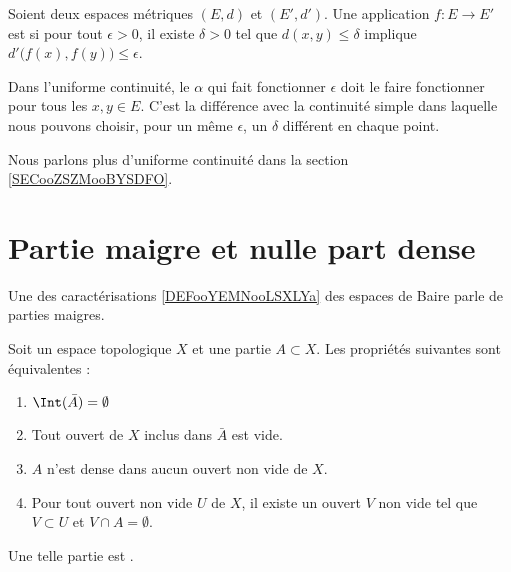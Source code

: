 \begin{definition}\label{DEFooYIPXooQTscbG}
	Soient deux espaces métriques \( (E,d)\) et \( (E',d')\). Une application \( f\colon E\to E'\) est  si pour tout \( \epsilon>0\), il existe \( \delta>0\) tel que \( d(x,y)\leq \delta\) implique \( d'\big( f(x),f(y) \big)\leq \epsilon\).
\end{definition}
Dans l'uniforme continuité, le \( \alpha\) qui fait fonctionner \( \epsilon\) doit le faire fonctionner pour tous les \( x,y\in E\). C'est la différence avec la continuité simple dans laquelle nous pouvons choisir, pour un même \( \epsilon\), un \( \delta\) différent en chaque point.

Nous parlons plus d'uniforme continuité dans la section \ref{SECooZSZMooBYSDFO}.

\section{Partie maigre et nulle part dense}


Une des caractérisations \ref{DEFooYEMNooLSXLYa} des espaces de Baire parle de parties maigres.


\begin{definition}		\label{DEFooTYNBooIaQINO}
	Soit un espace topologique \( X\) et une partie \( A\subset X\). Les propriétés suivantes sont équivalentes :
	\begin{enumerate}
		\item	\label{ITEMooFFSAooUdcUuV}
		      \( \Int(\bar A)=\emptyset\)
		\item		\label{ITEMooYKDEooYwNblV}
		      Tout ouvert de \( X\) inclus dans \( \bar A\) est vide.
		\item		\label{ITEMooOYOCooLkyrFx}
		      \( A\) n'est dense dans aucun ouvert non vide de \( X\).
		\item		\label{ITEMooGYICooSAelba}
		      Pour tout ouvert non vide \( U\) de \( X\), il existe un ouvert \( V\) non vide tel que \( V\subset U\) et \( V\cap A=\emptyset\).
	\end{enumerate}
	Une telle partie est .
\end{definition}

